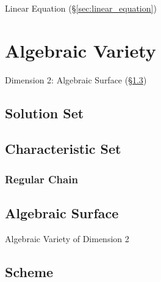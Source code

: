Linear Equation (\S\ref{sec:linear_equation})



\section{Algebraic Variety}\label{sec:algebraic_variety}

Dimension 2: Algebraic Surface (\S\ref{sec:algebraic_surface})



\subsection{Solution Set}\label{sec:solution_set}

\subsection{Characteristic Set}\label{sec:characteristic_set}

\subsubsection{Regular Chain}\label{sec:regular_chain}



\subsection{Algebraic Surface}\label{sec:algebraic_surface}

Algebraic Variety of Dimension 2



\subsection{Scheme}\label{sec:scheme}

